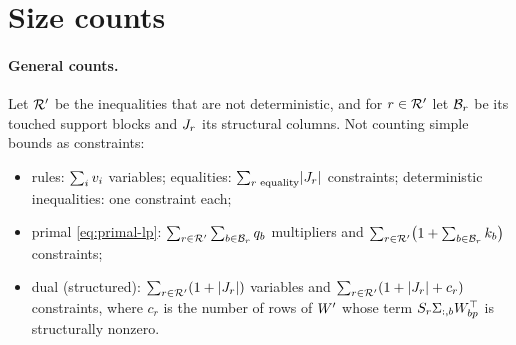 \section{Size counts}
\label{app:sizes}

\paragraph{General counts.}
Let $\mathcal{R}'$ be the inequalities that are not deterministic, and for $r \in \mathcal{R}'$ let $\mathcal{B}_r$ be its touched support blocks and $J_r$ its structural columns.
Not counting simple bounds as constraints:
\begin{itemize}[nosep]
\item rules: $\sum_i v_i$ variables; equalities: $\sum_{r \text{ equality}} \lvert J_r \rvert$ constraints; deterministic inequalities: one constraint each;
\item primal \eqref{eq:primal-lp}: $\sum_{r\in\mathcal{R}'}\sum_{b\in\mathcal{B}_r} q_b$ multipliers and $\sum_{r\in\mathcal{R}'}\bigl(1 + \sum_{b\in\mathcal{B}_r} k_b\bigr)$ constraints;
\item dual (structured): $\sum_{r\in\mathcal{R}'}(1 + \lvert J_r \rvert)$ variables and $\sum_{r\in\mathcal{R}'}(1 + \lvert J_r \rvert + c_r)$ constraints,
where $c_r$ is the number of rows of $W'$ whose term $S_r\Sigma_{:,b}W_{bp}^\top$ is structurally nonzero.
\end{itemize}

